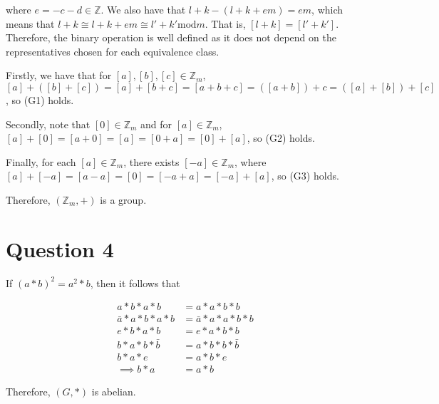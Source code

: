 \documentclass{article}
\begin{document}
where $e = -c - d \in \mathbb{Z}$. We also have that $l + k - (l + k + em) = em$, which means that $l + k \cong l + k + em \cong l' + k' \text{mod} m$. That is,
$[l + k] = [l' + k']$. Therefore, the binary operation is well defined as it does not depend on the representatives chosen for each equivalence class.

\hfill \break
Firstly, we have that for $[a], [b], [c] \in \mathbb{Z}_m$, $[a] + ([b] + [c]) = [a] + [b + c] = [a + b + c] = ([a + b]) + c = ([a] + [b]) + [c]$, so (G1) holds.

\hfill \break
Secondly, note that $[0] \in \mathbb{Z}_m$ and for $[a] \in \mathbb{Z}_m$, $[a] + [0] = [a + 0] = [a] = [0 + a] = [0] + [a]$, so (G2) holds.

\hfill \break
Finally, for each $[a] \in \mathbb{Z}_m$, there exists $[-a] \in \mathbb{Z}_m$, where $[a] + [-a] = [a - a] = [0] = [-a + a] = [-a] + [a]$, so (G3) holds.

\hfill \break
Therefore, $(\mathbb{Z}_m, +)$ is a group.

\section*{Question 4}
If $(a \ast b)^2 = a^2 \ast b$, then it follows that

\begin{align*}
    a \ast b \ast a \ast b &= a \ast a \ast b \ast b\\
    \bar{a} \ast a \ast b \ast a \ast b &= \bar{a} \ast a \ast a \ast b \ast b\\
    e \ast b \ast a \ast b &= e \ast a \ast b \ast b\\
    b \ast a \ast b \ast \bar{b} &= a \ast b \ast b \ast \bar{b}\\
    b \ast a \ast e &= a \ast b \ast e\\
    \implies b \ast a &= a \ast b
\end{align*}

Therefore, $(G, \ast)$ is abelian.
\end{document}

